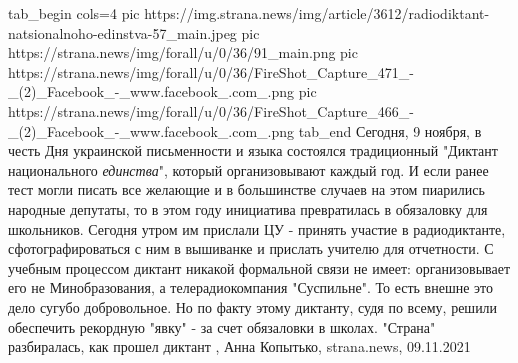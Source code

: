 \ifcmt
  tab_begin cols=4
     pic https://img.strana.news/img/article/3612/radiodiktant-natsionalnoho-edinstva-57_main.jpeg
     pic https://strana.news/img/forall/u/0/36/91_main.png
		 pic https://strana.news/img/forall/u/0/36/FireShot_Capture_471_-_(2)_Facebook_-_www.facebook_.com_.png
		 pic https://strana.news/img/forall/u/0/36/FireShot_Capture_466_-_(2)_Facebook_-_www.facebook_.com_.png
  tab_end
\fi
Сегодня, 9 ноября, в честь Дня украинской письменности и языка состоялся
традиционный "Диктант национального \emph{единства}", который организовывают каждый
год.  И если ранее тест могли писать все желающие и в большинстве случаев на
этом пиарились народные депутаты, то в этом году инициатива превратилась в
обязаловку для школьников.  Сегодня утром им прислали ЦУ - принять участие в
радиодиктанте, сфотографироваться с ним в вышиванке и прислать учителю для
отчетности.  С учебным процессом диктант никакой формальной связи не имеет:
организовывает его не Минобразования, а телерадиокомпания "Суспильне". То есть
внешне это дело сугубо добровольное. Но по факту этому диктанту, судя по всему,
решили обеспечить рекордную "явку" - за счет обязаловки в школах.  "Страна"
разбиралась, как прошел диктант
, 
Анна Копытько, strana.news, 09.11.2021
